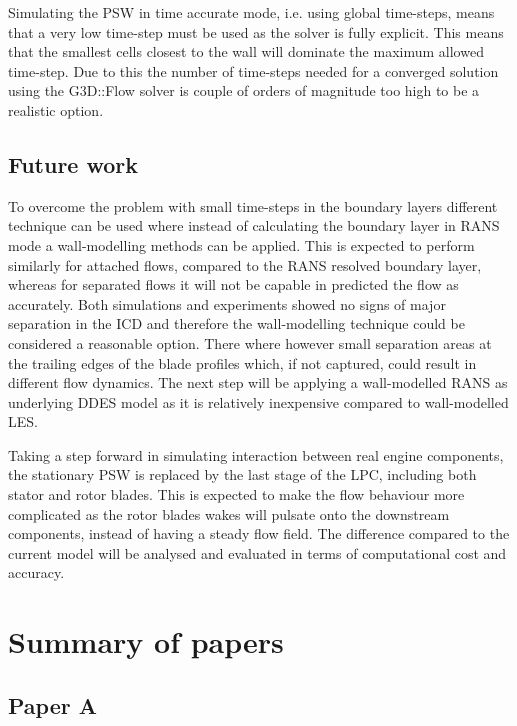 Simulating the PSW in time accurate mode, i.e. using global time-steps, means that a very low time-step must be used as the solver is fully explicit. This means that the smallest cells closest to the wall will dominate the maximum allowed time-step. Due to this the number of time-steps needed for a converged solution using the G3D::Flow solver is couple of orders of magnitude too high to be a realistic option.

\section{Future work}
To overcome the problem with small time-steps in the boundary layers different technique can be used where instead of calculating the boundary layer in RANS mode a wall-modelling methods can be applied. This is expected to perform similarly for attached flows, compared to the RANS resolved boundary layer, whereas for separated flows it will not be capable in predicted the flow as accurately. Both simulations and experiments showed no signs of major separation in the ICD and therefore the wall-modelling technique could be considered a reasonable option. There where however small separation areas at the trailing edges of the blade profiles which, if not captured, could result in different flow dynamics. The next step will be applying a wall-modelled RANS as underlying DDES model as it is relatively inexpensive compared to wall-modelled LES.

Taking a step forward in simulating interaction between real engine components, the stationary PSW is replaced by the last stage of the LPC, including both stator and rotor blades. This is expected to make the flow behaviour more complicated as the rotor blades wakes will pulsate onto the downstream components, instead of having a steady flow field. The difference compared to the current model will be analysed and evaluated in terms of computational cost and accuracy.


%           
\chapter{Summary of papers\label{ch:summary}}

\section{Paper A} 
